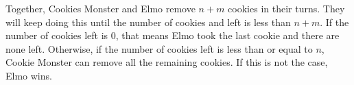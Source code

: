 Together, Cookies Monster and Elmo remove $n+m$ cookies in their turns. They will keep doing this until the number of cookies and left is less than $n+m$. If the number of cookies left is $0$, that means Elmo took the last cookie and there are none left. Otherwise, if the number of cookies left is less than or equal to $n$, Cookie Monster can remove all the remaining cookies. If this is not the case, Elmo wins.
